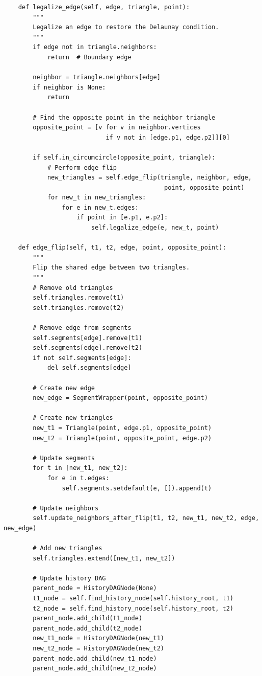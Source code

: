 \documentclass{article}
\begin{document}
\begin{verbatim}
    def legalize_edge(self, edge, triangle, point):
        """
        Legalize an edge to restore the Delaunay condition.
        """
        if edge not in triangle.neighbors:
            return  # Boundary edge

        neighbor = triangle.neighbors[edge]
        if neighbor is None:
            return

        # Find the opposite point in the neighbor triangle
        opposite_point = [v for v in neighbor.vertices 
                            if v not in [edge.p1, edge.p2]][0]

        if self.in_circumcircle(opposite_point, triangle):
            # Perform edge flip
            new_triangles = self.edge_flip(triangle, neighbor, edge, 
                                            point, opposite_point)
            for new_t in new_triangles:
                for e in new_t.edges:
                    if point in [e.p1, e.p2]:
                        self.legalize_edge(e, new_t, point)

    def edge_flip(self, t1, t2, edge, point, opposite_point):
        """
        Flip the shared edge between two triangles.
        """
        # Remove old triangles
        self.triangles.remove(t1)
        self.triangles.remove(t2)

        # Remove edge from segments
        self.segments[edge].remove(t1)
        self.segments[edge].remove(t2)
        if not self.segments[edge]:
            del self.segments[edge]

        # Create new edge
        new_edge = SegmentWrapper(point, opposite_point)

        # Create new triangles
        new_t1 = Triangle(point, edge.p1, opposite_point)
        new_t2 = Triangle(point, opposite_point, edge.p2)

        # Update segments
        for t in [new_t1, new_t2]:
            for e in t.edges:
                self.segments.setdefault(e, []).append(t)

        # Update neighbors
        self.update_neighbors_after_flip(t1, t2, new_t1, new_t2, edge, new_edge)

        # Add new triangles
        self.triangles.extend([new_t1, new_t2])

        # Update history DAG
        parent_node = HistoryDAGNode(None)
        t1_node = self.find_history_node(self.history_root, t1)
        t2_node = self.find_history_node(self.history_root, t2)
        parent_node.add_child(t1_node)
        parent_node.add_child(t2_node)
        new_t1_node = HistoryDAGNode(new_t1)
        new_t2_node = HistoryDAGNode(new_t2)
        parent_node.add_child(new_t1_node)
        parent_node.add_child(new_t2_node)


\end{verbatim}
\end{document}
